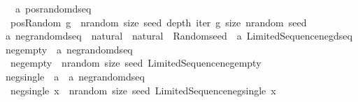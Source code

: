 \begin{isabellebody}
\ \ {\isasymRightarrow}\ {\isacharprime}{\kern0pt}a\ pos{\isacharunderscore}{\kern0pt}random{\isacharunderscore}{\kern0pt}dseq{\isachardoublequoteclose}\isanewline
{}\isanewline
\ \ {\isachardoublequoteopen}pos{\isacharunderscore}{\kern0pt}Random\ g\ {\isacharequal}{\kern0pt}\ {\isacharparenleft}{\kern0pt}{\isacharpercent}{\kern0pt}nrandom\ size\ seed\ depth{\isachardot}{\kern0pt}\ iter\ {\isacharparenleft}{\kern0pt}g\ size{\isacharparenright}{\kern0pt}\ nrandom\ seed{\isacharparenright}{\kern0pt}{\isachardoublequoteclose}\isanewline
\isanewline
\isanewline
{}\isamarkupfalse%
\ {\isacharprime}{\kern0pt}a\ neg{\isacharunderscore}{\kern0pt}random{\isacharunderscore}{\kern0pt}dseq\ {\isacharequal}{\kern0pt}\ {\isachardoublequoteopen}natural\ {\isasymRightarrow}\ natural\ {\isasymRightarrow}\ Random{\isachardot}{\kern0pt}seed\ {\isasymRightarrow}\ {\isacharprime}{\kern0pt}a\ Limited{\isacharunderscore}{\kern0pt}Sequence{\isachardot}{\kern0pt}neg{\isacharunderscore}{\kern0pt}dseq{\isachardoublequoteclose}\isanewline
\isanewline
{}\isamarkupfalse%
\ neg{\isacharunderscore}{\kern0pt}empty\ {\isacharcolon}{\kern0pt}{\isacharcolon}{\kern0pt}\ {\isachardoublequoteopen}{\isacharprime}{\kern0pt}a\ neg{\isacharunderscore}{\kern0pt}random{\isacharunderscore}{\kern0pt}dseq{\isachardoublequoteclose}\isanewline
{}\isanewline
\ \ {\isachardoublequoteopen}neg{\isacharunderscore}{\kern0pt}empty\ {\isacharequal}{\kern0pt}\ {\isacharparenleft}{\kern0pt}{\isacharpercent}{\kern0pt}nrandom\ size\ seed{\isachardot}{\kern0pt}\ Limited{\isacharunderscore}{\kern0pt}Sequence{\isachardot}{\kern0pt}neg{\isacharunderscore}{\kern0pt}empty{\isacharparenright}{\kern0pt}{\isachardoublequoteclose}\isanewline
\isanewline
{}\isamarkupfalse%
\ neg{\isacharunderscore}{\kern0pt}single\ {\isacharcolon}{\kern0pt}{\isacharcolon}{\kern0pt}\ {\isachardoublequoteopen}{\isacharprime}{\kern0pt}a\ {\isacharequal}{\kern0pt}{\isachargreater}{\kern0pt}\ {\isacharprime}{\kern0pt}a\ neg{\isacharunderscore}{\kern0pt}random{\isacharunderscore}{\kern0pt}dseq{\isachardoublequoteclose}\isanewline
{}\isanewline
\ \ {\isachardoublequoteopen}neg{\isacharunderscore}{\kern0pt}single\ x\ {\isacharequal}{\kern0pt}\ {\isacharparenleft}{\kern0pt}{\isacharpercent}{\kern0pt}nrandom\ size\ seed{\isachardot}{\kern0pt}\ Limited{\isacharunderscore}{\kern0pt}Sequence{\isachardot}{\kern0pt}neg{\isacharunderscore}{\kern0pt}single\ x{\isacharparenright}{\kern0pt}{\isachardoublequoteclose}\isanewline

\end{isabellebody}

